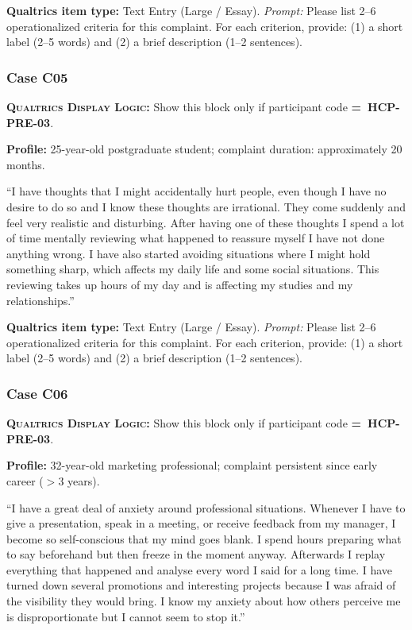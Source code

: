 \documentclass[11pt,a4paper]{article}
\newcommand{\responsetextarea}[1]{\begin{tcolorbox}[colback=ResponseBG,colframe=GoldAmber,boxrule=0.6pt,arc=1.5mm,left=6pt,right=6pt,top=5pt,bottom=5pt]\small\textbf{\color{GoldAmber}Qualtrics item type:} Text Entry (Large / Essay). \quad \textit{Prompt:} #1\end{tcolorbox}}
\newcommand{\dlnote}[1]{\par\vspace{0.15em}\noindent\begin{tcolorbox}[colback=AccentAmber,colframe=GoldAmber,boxrule=0.45pt,arc=1mm,left=5pt,right=5pt,top=2.5pt,bottom=2.5pt]\footnotesize\textbf{\color{GoldAmber}\scshape Qualtrics Display Logic:} Show this block only if participant code \textbf{=~#1}.\end{tcolorbox}\vspace{0.1em}}
\begin{document}
\responsetextarea{Please list 2--6 operationalized criteria for this complaint. For each criterion, provide: (1) a short label (2--5 words) and (2) a brief description (1--2 sentences).}

\vspace{0.4em}
\subsubsection*{Case C05}
\dlnote{HCP-PRE-03}

\begin{complaintbox}[title=Case C05 --- Complaint Vignette]
\textbf{Profile:} 25-year-old postgraduate student; complaint duration: approximately 20 months.

\smallskip
``I have thoughts that I might accidentally hurt people, even though I have no desire to do so and I know these thoughts are irrational. They come suddenly and feel very realistic and disturbing. After having one of these thoughts I spend a lot of time mentally reviewing what happened to reassure myself I have not done anything wrong. I have also started avoiding situations where I might hold something sharp, which affects my daily life and some social situations. This reviewing takes up hours of my day and is affecting my studies and my relationships.''
\end{complaintbox}

\responsetextarea{Please list 2--6 operationalized criteria for this complaint. For each criterion, provide: (1) a short label (2--5 words) and (2) a brief description (1--2 sentences).}

\vspace{0.4em}
\subsubsection*{Case C06}
\dlnote{HCP-PRE-03}

\begin{complaintbox}[title=Case C06 --- Complaint Vignette]
\textbf{Profile:} 32-year-old marketing professional; complaint persistent since early career ($>$3 years).

\smallskip
``I have a great deal of anxiety around professional situations. Whenever I have to give a presentation, speak in a meeting, or receive feedback from my manager, I become so self-conscious that my mind goes blank. I spend hours preparing what to say beforehand but then freeze in the moment anyway. Afterwards I replay everything that happened and analyse every word I said for a long time. I have turned down several promotions and interesting projects because I was afraid of the visibility they would bring. I know my anxiety about how others perceive me is disproportionate but I cannot seem to stop it.''
\end{complaintbox}
\end{document}
